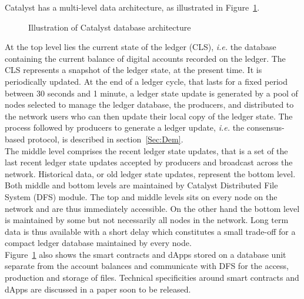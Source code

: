  Catalyst has a multi-level data architecture, as illustrated in Figure~\ref{fig:db}. 

\begin{figure}[H]
\label{fig:db}
\caption{\label{fig:db} Illustration of Catalyst database architecture}
\end{figure}

At the top level lies the current state of the ledger (CLS), \textit{i.e.} the database containing the current balance of digital accounts recorded on the ledger. The CLS represents a snapshot of the ledger state, at the present time. It is periodically updated. At the end of a ledger cycle, that lasts for a fixed period between 30 seconds and 1 minute, a ledger state update is generated by a pool of nodes selected to manage the ledger database, the producers, and distributed to the network users who can then update their local copy of the ledger state. The process followed by producers to generate a ledger update, \textit{i.e.} the consensus-based protocol, is described in section~\ref{Sec:Dem}.\\

The middle level comprises the recent ledger state updates, that is a set of the last recent ledger state updates accepted by producers and broadcast across the network. Historical data, or old ledger state updates, represent the bottom level. Both middle and bottom levels are maintained by Catalyst Distributed File System (DFS) module. The top and middle levels sits on every node on the network and are thus immediately accessible. On the other hand the bottom level is maintained by some but not necessarily all nodes in the network. Long term data is thus available with a short delay which constitutes a small trade-off for a compact ledger database maintained by every node.\\

Figure~\ref{fig:db} also shows the smart contracts and dApps  stored on a database unit separate from the account balances and communicate with DFS for the access, production and storage of files. Technical specificities around smart contracts and dApps are discussed in a paper soon to be released.  


